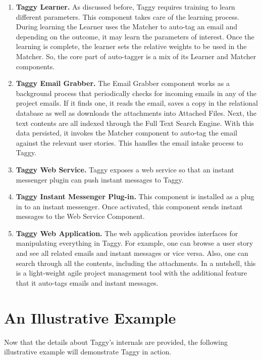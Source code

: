 \begin{enumerate}
	\item \textbf{Taggy Learner.} As discussed before, Taggy requires training to learn different parameters. This component takes care of the learning process. During learning the Learner uses the Matcher to auto-tag an email and depending on the outcome, it may learn the parameters of interest. Once the learning is complete, the learner sets the relative weights to be used in the Matcher. So, the core part of auto-tagger is a mix of its Learner and Matcher components.
	
	\item \textbf{Taggy Email Grabber.} The Email Grabber component works as a background process that periodically checks for incoming emails in any of the project emails. If it finds one, it reads the email, saves a copy in the relational database as well as downloads the attachments into Attached Files. Next, the text contents are all indexed through the Full Text Search Engine. With this data persisted, it invokes the Matcher component to auto-tag the email against the relevant user stories. This handles the email intake process to Taggy.
	
	\item \textbf{Taggy Web Service.} Taggy exposes a web service so that an instant messenger plugin can push instant messages to Taggy.
	
	\item \textbf{Taggy Instant Messenger Plug-in.} This component is installed as a plug in to an instant messenger. Once activated, this component sends instant messages to the Web Service Component.
	
	\item \textbf{Taggy Web Application.} The web application provides interfaces for manipulating everything in Taggy. For example, one can browse a user story and see all related emails and instant messages or vice versa. Also, one can search through all the contents, including the attachments. In a nutshell, this is a light-weight agile project management tool with the additional feature that it auto-tags emails and instant messages.
\end{enumerate}





\section{An Illustrative Example}	
Now that the details about Taggy's internals are provided, the following illustrative example will demonstrate Taggy in action.

